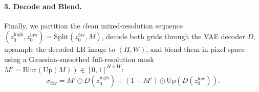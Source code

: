 \documentclass[11pt]{article}
\begin{document}
\paragraph{3. Decode and Blend.}
Finally, we partition the clean mixed-resolution sequence $(z_0^{\text{high}}, z_0^{\text{low}}) = \mathrm{Split}(z_0^{\text{fov}}, M)$, decode both grids through the VAE decoder $D$, upsample the decoded LR image to $(H, W)$, and blend them in pixel space using a Gaussian-smoothed full-resolution mask $M' = \mathrm{Blur}(\mathrm{Up}(M)) \in [0, 1]^{H \times W}$:
\begin{equation}
    x_{\text{fov}} = M' \odot D(z_0^{\text{high}}) + (1 - M') \odot \mathrm{Up}\!\left(D(z_0^{\text{low}})\right).
\end{equation}



\end{document}

